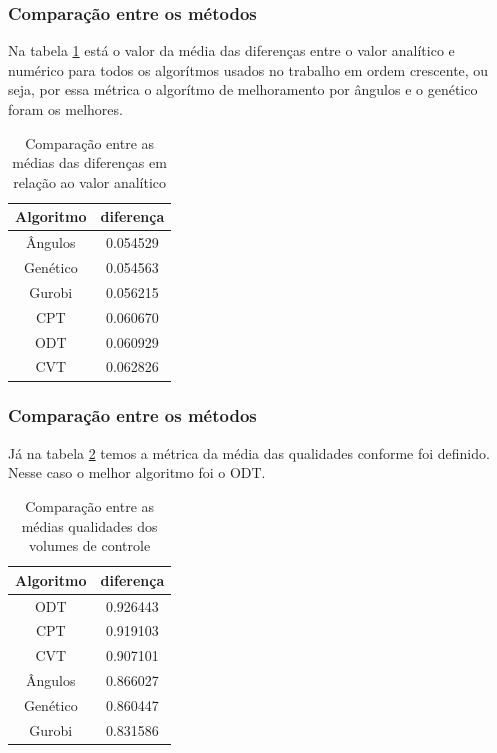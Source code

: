 \documentclass[brazil]{beamer}
\begin{document}
\begin{frame}
  \frametitle{Comparação entre os métodos}

  Na tabela \ref{tab:comparacao-analitico} está o valor da média das diferenças entre o valor analítico e numérico para todos os algorítmos usados no trabalho em ordem crescente, ou seja, por essa métrica o algorítmo de melhoramento por ângulos e o genético foram os melhores.

\begin{table}
    \centering
    \par\caption{Comparação entre as médias das diferenças em relação ao valor analítico}
    \begin{tabular}{c|c}
        Algoritmo&diferença\\\hline\hline
        Ângulos  &  0.054529 \\\hline
        Genético &  0.054563 \\\hline
        Gurobi   &  0.056215 \\\hline
        CPT      &  0.060670 \\\hline
        ODT      &  0.060929 \\\hline
        CVT      &  0.062826 \\\hline
    \end{tabular}
    \label{tab:comparacao-analitico}
\end{table}

\end{frame}

\begin{frame}
  \frametitle{Comparação entre os métodos}

  Já na tabela \ref{tab:comparacao-qualidade} temos a métrica da média das qualidades conforme foi definido. Nesse caso o melhor algoritmo foi o ODT.

\begin{table}
    \centering
    \par\caption{Comparação entre as médias qualidades dos volumes de controle}
    \begin{tabular}{c|c}
        Algoritmo&diferença\\\hline\hline
        ODT      &  0.926443 \\\hline
        CPT      &  0.919103 \\\hline
        CVT      &  0.907101 \\\hline
        Ângulos  &  0.866027 \\\hline
        Genético &  0.860447 \\\hline
        Gurobi   &  0.831586 \\\hline
    \end{tabular}
    \label{tab:comparacao-qualidade}
\end{table}

\end{frame}
\end{document}
